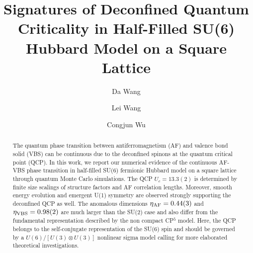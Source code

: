 \documentclass[twocolumn,superscriptaddress]{revtex4-1}
\begin{document}
\title{Signatures of Deconfined Quantum Criticality in Half-Filled SU(6) Hubbard Model on a Square Lattice}
\author{Da Wang} 
\author{Lei Wang} 
\author{Congjun Wu} 
\begin{abstract}
  The quantum phase transition between antiferromagnetism (AF) and valence bond solid (VBS) can be continuous due to the deconfined spinons at the quantum critical point (QCP). In this work, we report our numerical evidence of the continuous AF-VBS phase transition in half-filled SU(6) fermionic Hubbard model on a square lattice through quantum Monte Carlo simulations. The QCP $U_c=13.3(2)$ is determined by finite size scalings of structure factors and AF correlation lengths. Moreover, smooth energy evolution and emergent U(1) symmetry are observed strongly supporting the deconfined QCP as well. The anomalous dimensions $\eta_{\rm AF}=0.44(3)$ and $\eta_{\rm VBS}=0.98(2)$ are much larger than the SU(2) case and also differ from the fundamental representation described by the non compact CP$^{5}$ model. Here, the QCP belongs to the self-conjugate representation of the SU(6) spin and should be governed by a $U(6)/[U(3)\otimes U(3)]$ nonlinear sigma model calling for more elaborated theoretical investigations. 
\end{abstract}
\maketitle
\end{document}
